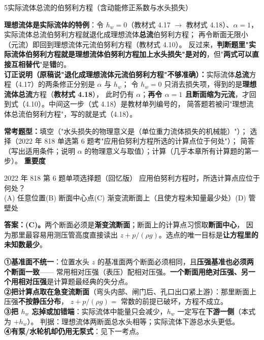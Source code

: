 \begin{kaodian}{5}{实际流体总流的伯努利方程（含动能修正系数与水头损失）}
\begin{tishi}
\textbf{理想流体是实际流体的特例}：令 $h_w=0$（教材式 4.17 $\to$ 教材式 4.18）、$\alpha=1$，实际流体总流伯努利方程就退化成理想流体\textbf{总流}伯努利方程；
再令断面无限小（元流）即回到理想流体元流伯努利方程（教材式 4.10）。
反过来，\textbf{判断题里"实际流体伯努利方程就是理想流体伯努利方程加上水头损失"是对的}，但"\textbf{两式可以直接互相替代}"是\textbf{错}的。\\
\textbf{订正说明（原稿说"退化成理想流体元流伯努利方程"不够准确）：}实际流体\textbf{总流}方程（4.17）的两条修正分别是 $\alpha$ 与 $h_w$；
令 $h_w=0$ 只消去损失项，得到的是\textbf{理想流体总流}方程（\textbf{教材式 4.18}），
此时仍有 $\alpha$；\textbf{再令 $\alpha=1$ 且断面缩为元流}，才回到式（4.10）。中间这一步（式 4.18）是教材单列编号的，
简答题若被问"理想流体总流伯努利方程"，写的就是式（4.18）。
\end{tishi}

\textbf{常考题型：}填空（"水头损失的物理意义是（单位重力流体损失的机械能）"）；
选择（2022 年 818 单选第 6 题考"应用伯努利方程所选的计算点位于何处"）；
简答（写出适用条件；说明 $\alpha$ 的物理意义与取值）；计算（几乎本章所有计算题的第一步）。
\textbf{重要度 }\quad{}\quad{}

\begin{zhenti}{2022 年 818 第 6 题}{单项选择题（回忆版）}
应用伯努利方程时，所选计算点应位于何处？\\
(A) 任意位置\quad (B) 断面中心点\quad (C) 渐变流断面上（且使方程未知量最少处）\quad (D) 管壁处
\end{zhenti}
\noindent\textbf{答案：(C)。}两个断面必须是\textbf{渐变流断面}；断面上的计算点习惯取\textbf{断面中心}，
因为那里最容易用测压管高度直接读出 $z+p/(\rho g)$。选点的唯一目标是\textbf{让方程里的未知数最少}。

\begin{yicuo}
\textbf{①基准面不统一}：位置水头 $z$ 的基准面两个断面必须相同，且\textbf{压强基准也必须两个断面一致}——
常用相对压强（表压）配相对压强。\textbf{一个断面用绝对压强、另一个用相对压强}是计算题最经典的失分点。\\
\textbf{②把计算点取在急变流断面}（弯头内部、闸门后、孔口出口紧上游）：那里断面上压强\textbf{不按静压分布}，
$z+p/(\rho g)=$ 常数的前提已破坏，方程不成立。\\
\textbf{③把 $h_w$ 忘掉或加错端}：实际流体中能量只会减少，$h_w$ 一定写在\textbf{下游一侧}（本式为 $+h_w$）。
判据：理想流体两断面总水头相等；实际流体下游总水头更低。\\
\textbf{④有泵/水轮机却仍用无泵式}：见下一考点。
\end{yicuo}
\end{kaodian}

